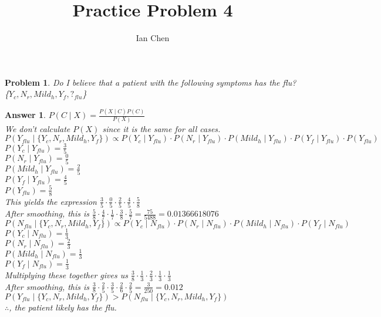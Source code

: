 \documentclass[11pt]{article}
\author{Ian Chen}
\title{Practice Problem 4}
\theoremstyle{description}
\newtheorem{problem}{Problem}
\theoremstyle{break}
\newtheorem*{answer}{Answer}
\begin{document}
    \maketitle

    \begin{problem}
        Do I believe that a patient with the following symptoms has the flu?\\
        \{$Y_c, N_r, Mild_h, Y_f, ?_{flu}$\}
    \end{problem}
    \begin{answer}
        $P(C\mid X) = \frac{P(X \mid C)P(C)}{P(X)}$\\
        We don't calculate $P(X)$ since it is the same for all cases.\\
        $P(Y_{flu} \mid \{Y_c, N_r, Mild_h, Y_f\}) \propto P(Y_c \mid Y_{flu})
        \cdot P(N_r \mid Y_{flu}) \cdot P(Mild_h \mid Y_{flu}) \cdot P(Y_f \mid Y_{flu})
        \cdot P(Y_{flu})$\\
        $P(Y_c \mid Y_{flu}) = \frac{3}{5}$\\
        $P(N_r \mid Y_{flu}) = \frac{0}{5}$\\
        $P(Mild_h \mid Y_{flu}) = \frac{2}{5}$\\
        $P(Y_f \mid Y_{flu}) = \frac{4}{5}$\\
        $P(Y_{flu}) = \frac{5}{8}$\\
        This yields the expression $\frac{3}{5} \cdot \frac{0}{5} \cdot \frac{2}{5} \cdot \frac{4
        }{5} \cdot \frac{5}{8}$\\
        After smoothing, this is $\frac{5}{8} \cdot \frac{4}{7} \cdot \frac{1}{7} \cdot \frac{3}{8
        } \cdot \frac{5}{7} = \frac{75}{5488} = 0.01366618076$\\
        $P(N_{flu} \mid \{Y_c, N_r, Mild_h, Y_f\}) \propto P(Y_c \mid N_{flu}) \cdot
        P(N_r \mid N_{flu}) \cdot P(Mild_h \mid N_{flu}) \cdot P(Y_f \mid N_{flu})$\\
        $P(Y_c \mid N_{flu}) = \frac{1}{3}$\\
        $P(N_r \mid N_{flu}) = \frac{2}{3}$\\
        $P(Mild_h \mid N_{flu}) = \frac{1}{3}$\\
        $P(Y_f \mid N_{flu}) = \frac{1}{3}$\\
        Multiplying these together gives us $\frac{3}{8} \cdot \frac{1}{3} \cdot \frac{2}{3} \cdot
        \frac{1}{3} \cdot \frac{1}{3}$\\
        After smoothing, this is $\frac{3}{8} \cdot \frac{2}{5} \cdot \frac{3}{5} \cdot
        \frac{2}{6} \cdot \frac{2}{5} = \frac{3}{250} = 0.012$\\
        $P(Y_{flu} \mid \{Y_c, N_r, Mild_h, Y_f\}) > P(N_{flu} \mid \{Y_c, N_r, Mild_h, Y_f\})$\\
        $\therefore$, the patient likely has the flu.
    \end{answer}
\end{document}
